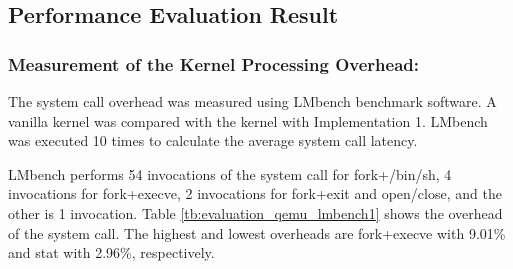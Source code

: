 

\subsection{Performance Evaluation Result}
\subsubsection{Measurement of the Kernel Processing Overhead:}

The system call overhead was measured using LMbench benchmark software. 
%
A vanilla kernel was compared with the kernel with Implementation 1.
LMbench was executed 10 times to calculate the average system call latency.

LMbench performs 54 invocations of the system call for fork+/bin/sh, 4 invocations
for fork+execve, 2 invocations for fork+exit and open/close, and the other is 1
invocation.
Table \ref{tb:evaluation_qemu_lmbench1} shows the overhead of the system call. The
highest and lowest overheads are fork+execve with 9.01\% and stat with 2.96\%,
respectively.

